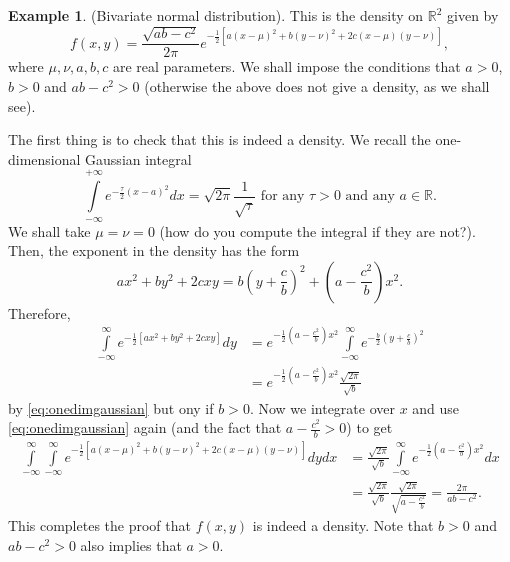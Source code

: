 \documentclass[preprint,  11pt]{amsart}
\newcommand\x{\mathbf{x}}
\theoremstyle{plain} %
\theoremstyle{definition} %
\newtheorem{example}[theorem]{Example}
\begin{document}
\begin{example} (Bivariate normal distribution). This is the density on $\mathbb{R}^{2}$ given by
$$
f(x,y)=\frac{\sqrt{ab-c^{2}}}{2\pi}e^{-\frac{1}{2}\left[a(x-\mu)^{2}+b(y-\nu)^{2}+2c(x-\mu)(y-\nu) \right]},
$$
where $\mu,\nu,a,b,c$ are real parameters. We shall impose the conditions that $a>0$, $b>0$ and $ab-c^{2}>0$ (otherwise the above does not give a density, as we shall see).

The first thing is to check that this is indeed a density. We recall the one-dimensional Gaussian integral 
\begin{equation}\label{eq:onedimgaussian}
\int\limits_{-\infty}^{+\infty}e^{-\frac{\tau}{2}(x-a)^{2}}dx = \sqrt{2\pi}\frac{1}{\sqrt{\tau}} \mbox{ for any }\tau>0 \mbox{ and any }a\in \mathbb{R}.
\end{equation}
We shall take $\mu=\nu=0$ (how do you compute the integral  if they are not?). Then, the exponent in the density has the form
$$
ax^{2}+by^{2}+2cxy = b\left(y+\frac{c}{b}\right)^{2}+\left(a-\frac{c^{2}}{b}\right)x^{2}.
$$
Therefore, 
\begin{align*}
\int\limits_{-\infty}^{\infty}e^{-\frac{1}{2}\left[ax^{2}+by^{2}+2cxy \right]} dy &= e^{-\frac{1}{2}(a-\frac{c^{2}}{b})x^{2}} \int\limits_{-\infty}^{\infty}e^{-\frac{b}{2}(y+\frac{c}{b})^{2}} \\
&= e^{-\frac{1}{2}(a-\frac{c^{2}}{b})x^{2}}\frac{\sqrt{2\pi}}{\sqrt{b}}
\end{align*}
by \eqref{eq:onedimgaussian} but ony if $b>0$. Now we integrate over $x$ and use \eqref{eq:onedimgaussian} again (and the fact that $a-\frac{c^{2}}{b}>0$) to get
\begin{align*}
\int\limits_{-\infty}^{\infty}\int\limits_{-\infty}^{\infty}e^{-\frac{1}{2}\left[a(x-\mu)^{2}+b(y-\nu)^{2}+2c(x-\mu)(y-\nu) \right]}dydx &= \frac{\sqrt{2\pi}}{\sqrt{b}} \int\limits_{-\infty}^{\infty} e^{-\frac{1}{2}(a-\frac{c^{2}}{b})x^{2}}dx \\
&= \frac{\sqrt{2\pi}}{\sqrt{b}} \frac{\sqrt{2\pi}}{\sqrt{a-\frac{c^{2}}{b}}} = \frac{2\pi}{ab-c^{2}}.
\end{align*}
This completes the proof that $f(x,y)$ is indeed a density. Note that $b>0$ and $ab-c^{2}>0$ also implies that $a>0$.
\end{example}
\end{document}
